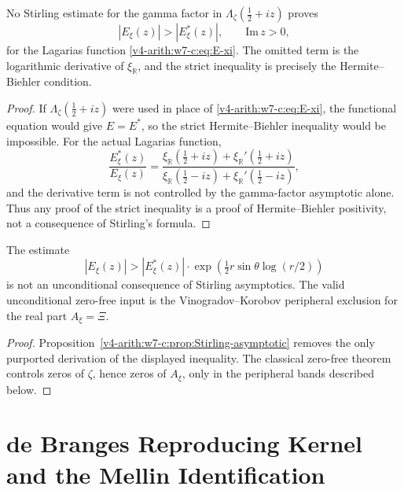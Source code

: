\begin{proposition}
\label{v4-arith:w7-c:prop:Stirling-asymptotic}
No Stirling estimate for the gamma factor in
\(\Lambda_{\zeta}(\tfrac12+iz)\) proves
\[
|E_{\xi}(z)|>|E_{\xi}^{*}(z)|,\qquad \mathrm{Im}\,z>0,
\]
for the Lagarias function \eqref{v4-arith:w7-c:eq:E-xi}.  The omitted
term is the logarithmic derivative of \(\xi_{\mathbb R}\), and the
strict inequality is precisely the Hermite--Biehler condition.
\end{proposition}

\begin{proof}
If \(\Lambda_{\zeta}(\tfrac12+iz)\) were used in place of
\eqref{v4-arith:w7-c:eq:E-xi}, the functional equation would give
\(E=E^{*}\), so the strict Hermite--Biehler inequality would be
impossible.  For the actual Lagarias function,
\[
\frac{E_{\xi}^{*}(z)}{E_{\xi}(z)}
=
\frac{\xi_{\mathbb R}(\tfrac12+iz)+\xi_{\mathbb R}'(\tfrac12+iz)}
{\xi_{\mathbb R}(\tfrac12-iz)+\xi_{\mathbb R}'(\tfrac12-iz)},
\]
and the derivative term is not controlled by the gamma-factor
asymptotic alone.  Thus any proof of the strict inequality is a proof
of Hermite--Biehler positivity, not a consequence of Stirling's
formula.
\end{proof}

\begin{corollary}
\label{v4-arith:w7-c:cor:Stirling-zero-free}
The estimate
\[
|E_{\xi}(z)|>|E_{\xi}^{*}(z)|\cdot
\exp\!\left(\tfrac12 r\sin\theta\log(r/2)\right)
\]
is not an unconditional consequence of Stirling asymptotics.  The
valid unconditional zero-free input is the Vinogradov--Korobov
peripheral exclusion for the real part \(A_{\xi}=\Xi\).
\end{corollary}

\begin{proof}
Proposition~\ref{v4-arith:w7-c:prop:Stirling-asymptotic} removes the only
purported derivation of the displayed inequality.  The classical
zero-free theorem controls zeros of \(\zeta\), hence zeros of
\(A_{\xi}\), only in the peripheral bands described below.
\end{proof}

\section{de Branges Reproducing Kernel and the Mellin Identification}
\label{v4-arith:w7-c:dB-kernel}

